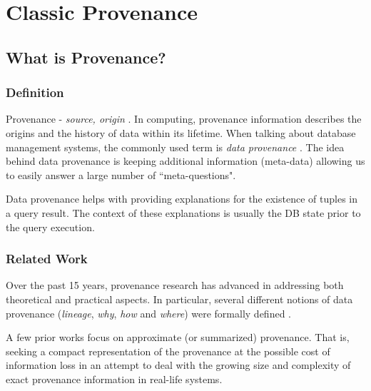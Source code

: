 \chapter{Classic Provenance}
\label{chap:classic_provenance}

\section{What is Provenance?}

\subsection{Definition}
Provenance - \textit{source, origin} \cite{prov_dict}. 
In computing, provenance information describes the origins and the history of data within its lifetime. When talking about database management systems, the commonly used term is \textit{data provenance} \cite{cheney2009provenance}. The idea behind data provenance is keeping additional information (meta-data) allowing us to easily answer a large number of ``meta-questions".
\par Data provenance helps with providing explanations for the existence of tuples in a query result. The context of these explanations is usually the DB state prior to the query execution.

\subsection{Related Work} Over the past 15 years, provenance research has advanced in addressing both theoretical \cite{cheney2009provenance, green2007provenance, Deutch2014} 
and practical \cite{Ives2008, Karvounarakis2010, Deutch2015, Deutch2017, Senellart2018, DBLP:conf/cidr/IvesZHZ19} 
aspects. 
In particular, several different notions of data provenance (\textit{lineage}, \textit{why}, \textit{how} and \textit{where}) were formally defined \cite{Cui:2000:TLV:357775.357777, DBLP:conf/icdt/BunemanKT01,  cheney2009provenance}.
\par A few prior works \cite{approx_lineage, approx_PROX, approx_summary, approx_why_and_why_not} focus on approximate (or summarized) provenance. That is, seeking a compact representation of the provenance at the possible cost of information loss in an attempt to deal with the growing size and complexity of exact provenance information in real-life systems.



